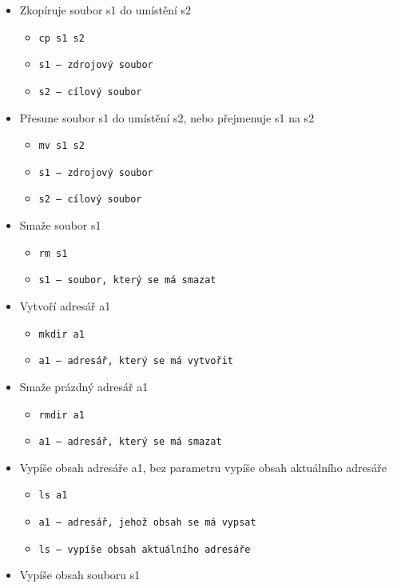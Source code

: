 \documentclass[12pt, a4paper]{article}
\begin{document}
\begin{itemize}[itemsep=-5pt]
    \item Zkopíruje soubor s1 do umístění s2
    \begin{itemize}
        \item[] \texttt{cp s1 s2}
        \item[] \texttt{s1 -- zdrojový soubor}
        \item[] \texttt{s2 -- cílový soubor}
    \end{itemize}
    \item Přesune soubor s1 do umístění s2, nebo přejmenuje s1 na s2
    \begin{itemize}
        \item[] \texttt{mv s1 s2}
        \item[] \texttt{s1 -- zdrojový soubor}
        \item[] \texttt{s2 -- cílový soubor}
    \end{itemize}
    \item Smaže soubor s1
    \begin{itemize}
        \item[] \texttt{rm s1}
        \item[] \texttt{s1 -- soubor, který se má smazat}
    \end{itemize}
    \item Vytvoří adresář a1
    \begin{itemize}
        \item[] \texttt{mkdir a1}
        \item[] \texttt{a1 -- adresář, který se má vytvořit}
    \end{itemize}
    \item Smaže prázdný adresář a1
    \begin{itemize}
        \item[] \texttt{rmdir a1}
        \item[] \texttt{a1 -- adresář, který se má smazat}
    \end{itemize}
    \item Vypíše obsah adresáře a1, bez parametru vypíše obsah aktuálního adresáře
    \begin{itemize}
        \item[] \texttt{ls a1}
        \item[] \texttt{a1 -- adresář, jehož obsah se má vypsat}
        \item[] \texttt{ls -- vypíše obsah aktuálního adresáře}
    \end{itemize}
    \item Vypíše obsah souboru s1

\end{itemize}
\end{document}
